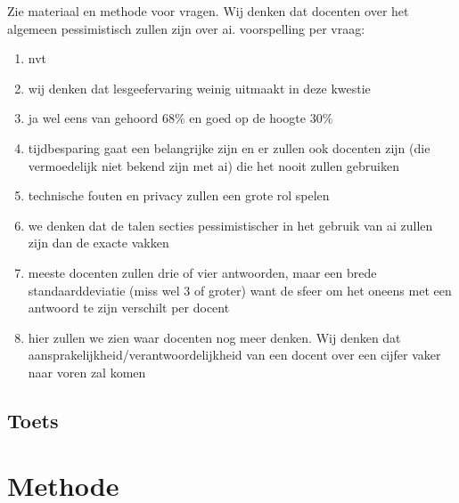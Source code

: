 \documentclass[12pt]{article}
\begin{document}
\begin{multicols}{2}
Zie materiaal en methode voor vragen.
Wij denken dat docenten over het algemeen pessimistisch zullen zijn over ai. 
voorspelling per vraag:
\begin{enumerate}
\item nvt
\item wij denken dat lesgeefervaring weinig uitmaakt in deze kwestie
\item ja wel eens van gehoord \(68\%\) en goed op de hoogte \(30\%\)
\item tijdbesparing gaat een belangrijke zijn en er zullen ook docenten zijn (die vermoedelijk niet bekend zijn met ai) die het nooit zullen gebruiken
\item technische fouten en privacy zullen een grote rol spelen
\item we denken dat de talen secties pessimistischer in het gebruik van ai zullen zijn dan de exacte vakken
\item meeste docenten zullen drie of vier antwoorden, maar een brede standaarddeviatie (miss wel 3 of groter) want de sfeer om het oneens met een antwoord te zijn verschilt per docent
\item hier zullen we zien waar docenten nog meer denken. Wij denken dat aansprakelijkheid/verantwoordelijkheid van een docent over een cijfer vaker naar voren zal komen
\end{enumerate}
\end{multicols}

\pagebreak
\subsection{Toets}
\pagebreak

\section{Methode}
\end{document}
